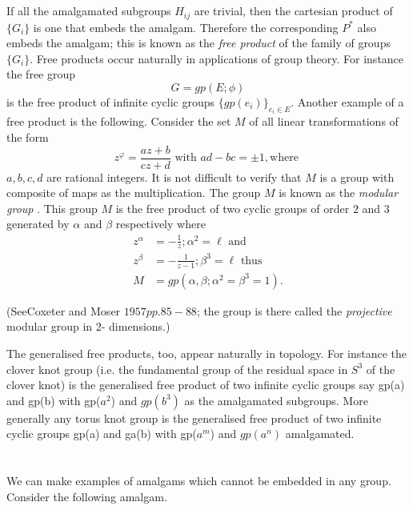 \section{}\label{chap9:sec2}%

If all the amalgamated subgroups $H_{ij}$ are trivial, then the
cartesian product of $\{G_i \}$ is one that embeds the
amalgam. Therefore the corresponding $P^*$ also embeds the amalgam;
this is  known as the \textit{ free product } of the family of groups
$\{G_i \}$. Free products occur naturally in applications of group
theory. For instance the free group  
$$
G = gp(E ; \phi)
$$
is the free product of infinite cyclic groups $\big\{ gp(e_i)
\big\}_{e_i \in E}$. Another example of a free product is the
following. Consider the set $M$ of all linear transformations of the
form 
$$
z^{\varphi}= \frac{az+b}{cz+d} \text{ with } ad-bc= \pm 1, \text{
  where } 
$$
$a,b,c,d$ are rational integers. It is not difficult to verify that
$M$ is a group with composite of maps as the multiplication. The group
$M$ is known as the \textit{ modular group }. This group $M$ is the
free product of two cyclic groups of order $2$ and $3$ generated by
$\alpha $ and $\beta$ respectively where   
\begin{align*}
  z^{\alpha} & = - \frac{1}{z}; \alpha^2 = \ell \text{ and }\\
  z^{\beta } & = - \frac{1}{z-1}; \beta^3 = \ell \text{ thus }\\
  M & = gp(\alpha, \beta; \alpha^2 = \beta^3 = 1).
\end{align*}

(See\pageoriginale Coxeter and Moser $1957 pp. 85-88$; the group is there called the
\textit{ projective } modular group in $2$- dimensions.) 

The generalised free products, too, appear naturally in topology. For
instance the clover knot group (i.e. the fundamental group of the
residual space in $S^3$ of the clover knot) is the generalised free
product of two infinite cyclic groups say gp(a) and gp(b) with
gp($a^2$) and $gp(b^3)$ as the amalgamated subgroups. More generally
any torus knot group is the generalised free product of two infinite
cyclic groups gp(a) and ga(b) with gp($a^m$) and $gp(a^n)$
amalgamated. 

\section{}\label{chap9:sec3}%

We can make examples of amalgams which cannot be embedded in any
group. Consider the following amalgam. 

